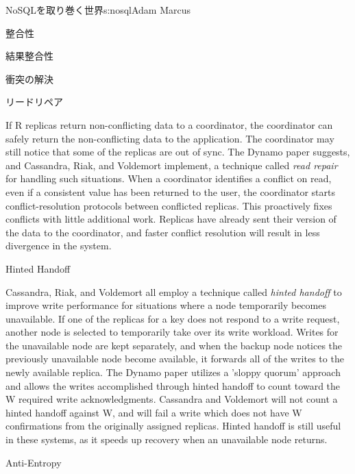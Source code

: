 \begin{aosachapter}{NoSQLを取り巻く世界}{s:nosql}{Adam Marcus}
\begin{aosasect1}{整合性}
\begin{aosasect2}{結果整合性}
\begin{aosasect3}{衝突の解決}
\end{aosasect3}

\begin{aosasect3}{リードリペア}

If R replicas return non-conflicting data to a coordinator, the
coordinator can safely return the non-conflicting data to the
application.  The coordinator may still notice that some of the
replicas are out of sync.  The Dynamo paper suggests, and Cassandra,
Riak, and Voldemort implement, a technique called \emph{read repair}
for handling such situations.  When a coordinator identifies a
conflict on read, even if a consistent value has been returned to the
user, the coordinator starts conflict-resolution protocols between
conflicted replicas.  This proactively fixes conflicts with little
additional work.  Replicas have already sent their version of the data to
the coordinator, and faster conflict resolution will result in less
divergence in the system.

\end{aosasect3}

\begin{aosasect3}{Hinted Handoff}

Cassandra, Riak, and Voldemort all employ a technique called
\emph{hinted handoff} to improve write performance for situations
where a node temporarily becomes unavailable. If one of the replicas
for a key does not respond to a write request, another node is
selected to temporarily take over its write workload.  Writes for the
unavailable node are kept separately, and when the backup node notices
the previously unavailable node become available, it forwards all of
the writes to the newly available replica.  The Dynamo paper utilizes
a 'sloppy quorum' approach and allows the writes accomplished through
hinted handoff to count toward the W required write acknowledgments.
Cassandra and Voldemort will not count a hinted handoff against W, and
will fail a write which does not have W confirmations from the
originally assigned replicas.  Hinted handoff is still useful in these
systems, as it speeds up recovery when an unavailable node returns.

\end{aosasect3}

\begin{aosasect3}{Anti-Entropy}


\end{aosasect3}
\end{aosasect2}
\end{aosasect1}
\end{aosachapter}
